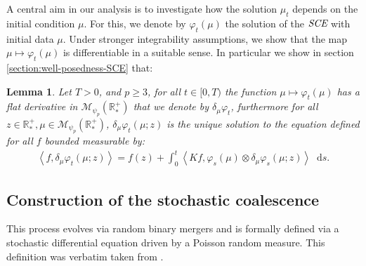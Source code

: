 \documentclass[11pt,a4paper]{article}
\newcommand{\RRP}{\mathbb{R}^+_*}
\newcommand{\MC}{\mathcal{M}}
\newcommand{\SCE}{\emph{SCE}}
\newcommand{\brac}[1]{\left\langle#1\right\rangle}
\newcommand{\dd}{\mathop{}\!\mathrm{d}}
\newtheorem{lemma}[theorem]{Lemma}
\begin{document}
    \medskip
    A central aim in our analysis is to investigate how the solution $\mu_t$ depends on the initial condition $\mu$. For this, we denote by $\varphi_t(\mu)$ the solution of the $\SCE$ with initial data $\mu$. Under stronger integrability assumptions, we show that the map $\mu \mapsto \varphi_t(\mu)$ is differentiable in a suitable sense. In particular we show in section \ref{section:well-posedness-SCE} that:
\begin{lemma}\label{lem:derivative-existence-and-eq}
    Let $T > 0$, and $p \geq 3$, for all $t \in [0,T)$ the function $ \mu \mapsto \varphi_t(\mu)$ has a flat derivative in $\MC_{\psi_p}(\RRP)$ that we denote by $\delta_\mu\varphi_t$, furthermore for all $z \in \RRP, \mu \in \MC_{\psi_p}(\RRP)$, $\delta_\mu\varphi_t(\mu;z)$ is the unique solution to the equation defined for all $f$ bounded measurable by:
    \begin{align*}
        \brac{f,\delta_\mu\varphi_t(\mu;z)} = f(z) + \int_0^t \brac{Kf,\varphi_s(\mu)\otimes \delta_\mu\varphi_s(\mu;z)} \dd s.
    \end{align*}
\end{lemma}
\subsection{Construction of the stochastic coalescence}
This process evolves via random binary mergers and is formally defined via a stochastic differential equation driven by a Poisson random measure. This definition was verbatim taken from \cite{fournier2006some,fournierStochasticCoalescenceHomogeneouslike2009}. 
\end{document}
